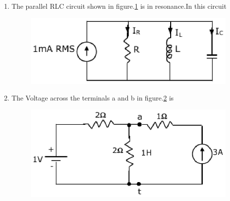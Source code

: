 \documentclass[journal,12pt,twocolumn]{IEEEtran}
\begin{document}
\begin{enumerate}
\item The parallel RLC circuit shown in figure.\ref{fig21} is in resonance.In this circuit
\begin{enumerate}
\setlength\itemsep{2em}
\begin{figure}[!h]
\begin{center}
\includegraphics[scale=0.5]{./figs/fig21.eps}
\caption{}
\label{fig21}
\end{center}
\end{figure}
\end{enumerate}

\item The Voltage across the terminals a and b in figure.\ref{fig22} is
\begin{enumerate}
\setlength\itemsep{2em}
\begin{figure}[!h]
\begin{center}
\includegraphics[scale=0.5]{./figs/fig22.eps}
\caption{}
\label{fig22}
\end{center}
\end{figure}
\end{enumerate}


\end{enumerate}
\end{document}
